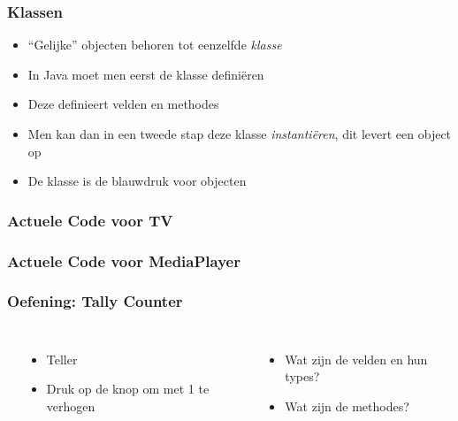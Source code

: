 \begin{frame}
  \frametitle{Klassen}
  \begin{itemize}
    \item ``Gelijke'' objecten behoren tot eenzelfde \emph{klasse}
    \item In Java moet men eerst de klasse defini\"eren
    \item Deze definieert velden en methodes
    \item Men kan dan in een tweede stap deze klasse \emph{instanti\"eren}, dit levert een object op
    \item De klasse is de blauwdruk voor objecten
  \end{itemize}
  \begin{center}
  \end{center}
\end{frame}

\begin{frame}
  \frametitle{Actuele Code voor TV}
\end{frame}

\begin{frame}
  \frametitle{Actuele Code voor MediaPlayer}
\end{frame}

\begin{frame}
  \frametitle{Oefening: Tally Counter}
  \begin{columns}
    \begin{center}
    \end{center}

    \begin{itemize}
      \item Teller
      \item Druk op de knop om met 1 te verhogen
    \end{itemize}
    \vskip5mm
    \begin{itemize}
      \item Wat zijn de velden en hun types?
      \item Wat zijn de methodes?
    \end{itemize}
  \end{columns}
\end{frame}

